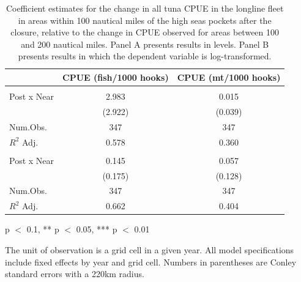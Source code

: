 \begin{table}
\centering
\begin{threeparttable}
\small
\caption{\label{tab:h3_reg_all_ll}Coefficient estimates for the change in all tuna CPUE in the longline fleet in
             areas within 100 nautical miles of the high seas pockets after the closure, relative to the change in CPUE
             observed for areas between 100 and 200 nautical miles.
             Panel A presents results in levels. Panel B presents results in which the dependent variable is log-transformed.}
\centering
\begin{tabular}[t]{lcc}
\toprule
  & CPUE (fish/1000 hooks) & CPUE (mt/1000 hooks)\\
\midrule
\addlinespace[0.5em]
\multicolumn{3}{l}{\textit{A) Levels}}\\
\midrule \hspace{1em}Post x Near & 2.983 & 0.015\\
\hspace{1em} & (2.922) & (0.039)\\
\hspace{1em}Num.Obs. & 347 & \vphantom{1} 347\\
\hspace{1em}$R^2$ Adj. & 0.578 & 0.360\\
\addlinespace[0.5em]
\multicolumn{3}{l}{\textit{B) Log-transformed}}\\
\midrule \hspace{1em}Post x Near & 0.145 & 0.057\\
\hspace{1em} & (0.175) & (0.128)\\
\hspace{1em}Num.Obs. & 347 & 347\\
\hspace{1em}$R^2$ Adj. & 0.662 & 0.404\\
\bottomrule
\end{tabular}
\begin{tablenotes}
\small
\item * p $<$ 0.1, ** p $<$ 0.05, *** p $<$ 0.01
\item The unit of observation is a grid cell in a given year. All model specifications include fixed effects by year and grid cell. Numbers in parentheses are Conley standard errors with a 220km radius.
\end{tablenotes}
\end{threeparttable}
\end{table}
